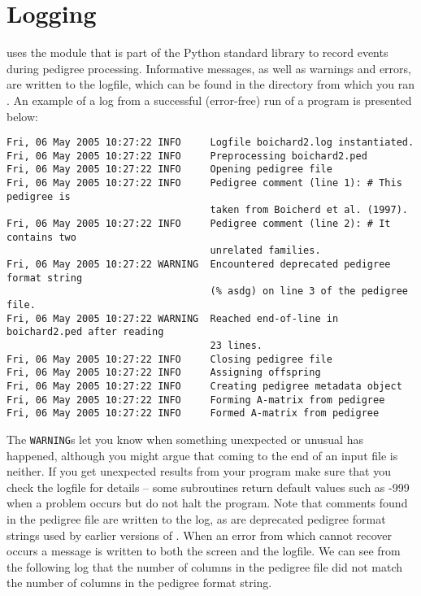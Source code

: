 \section{Logging}
\label{sec:logging}
\PyPedal{} uses the  module that is part of the Python standard library to record events during pedigree processing.  Informative messages, as well as warnings and errors, are written to the logfile, which can be found in the directory from which you ran \PyPedal{}.  An example of a log from a successful (error-free) run of a program is presented below:
\begin{verbatim}
Fri, 06 May 2005 10:27:22 INFO     Logfile boichard2.log instantiated.
Fri, 06 May 2005 10:27:22 INFO     Preprocessing boichard2.ped
Fri, 06 May 2005 10:27:22 INFO     Opening pedigree file
Fri, 06 May 2005 10:27:22 INFO     Pedigree comment (line 1): # This pedigree is
                                   taken from Boicherd et al. (1997).
Fri, 06 May 2005 10:27:22 INFO     Pedigree comment (line 2): # It contains two
                                   unrelated families.
Fri, 06 May 2005 10:27:22 WARNING  Encountered deprecated pedigree format string
                                   (% asdg) on line 3 of the pedigree file.
Fri, 06 May 2005 10:27:22 WARNING  Reached end-of-line in boichard2.ped after reading
                                   23 lines.
Fri, 06 May 2005 10:27:22 INFO     Closing pedigree file
Fri, 06 May 2005 10:27:22 INFO     Assigning offspring
Fri, 06 May 2005 10:27:22 INFO     Creating pedigree metadata object
Fri, 06 May 2005 10:27:22 INFO     Forming A-matrix from pedigree
Fri, 06 May 2005 10:27:22 INFO     Formed A-matrix from pedigree
\end{verbatim}
The \texttt{WARNING}s let you know when something unexpected or unusual has happened, although you might argue that coming to the end of an input file is neither.  If you get unexpected results from your program make sure that you check the logfile for details -- some subroutines return default values such as -999 when a problem occurs but do not halt the program.  Note that comments found in the pedigree file are written to the log, as are deprecated pedigree format strings used by earlier versions of \PyPedal{}.  When an error from which \PyPedal{} cannot recover occurs a message is written to both the screen and the logfile.  We can see from the following log that the number of columns in the pedigree file did not match the number of columns in the pedigree format string.
